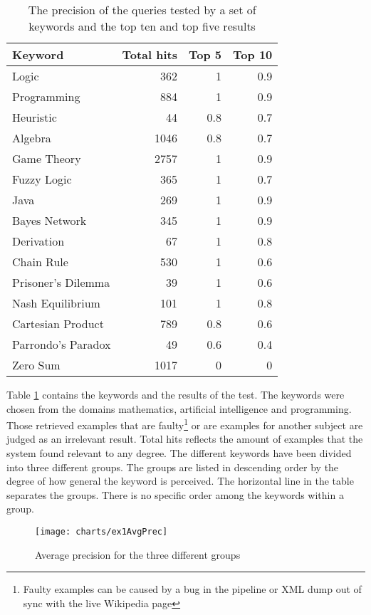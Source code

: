\begin{table}[h]
\centering
\small
\begin{tabular} {|| p{15em} | r | r | r ||} 
 \hline
 Keyword & Total hits & Top 5 & Top 10 \\ [0.5ex] 
 \hline

Logic & 362 & 1 & 0.9 \\
Programming & 884 & 1 & 0.9 \\
Heuristic & 44 & 0.8 & 0.7 \\
Algebra & 1046 & 0.8 & 0.7 \\
Game Theory & 2757 & 1 & 0.9 \\
\hline
Fuzzy Logic & 365 & 1 & 0.7 \\
Java & 269 & 1 & 0.9 \\
Bayes Network & 345 & 1 & 0.9 \\
Derivation & 67 & 1 & 0.8 \\
\hline
Chain Rule & 530 & 1 & 0.6 \\
Prisoner's Dilemma & 39 & 1 & 0.6 \\
Nash Equilibrium & 101 & 1 & 0.8 \\
Cartesian Product & 789 & 0.8 & 0.6 \\
Parrondo's Paradox & 49 & 0.6 & 0.4 \\
Zero Sum & 1017 & 0 & 0 \\

 \hline
\end{tabular}
\caption{The precision of the queries tested by a set of keywords and the top ten and top five results}
\label{table:precision_test}
\end{table}

Table \ref{table:precision_test} contains the keywords and the results of the test. The keywords were chosen from the domains mathematics, artificial intelligence and programming. Those retrieved examples that are faulty\footnote{Faulty examples can be caused by a bug in the pipeline or XML dump out of sync with the live Wikipedia page} or are examples for another subject are judged as an irrelevant result. Total hits reflects the amount of examples that the system found relevant to any degree. The different keywords have been divided into three different groups. The groups are listed in descending order by the degree of how general the keyword is perceived. The horizontal line in the table separates the groups. There is no specific order among the keywords within a group.

\begin{figure}[H] 
\caption{Average precision for the three different groups}
\texttt{[image: charts/ex1AvgPrec]}
\label{fig:ex1AvgPrec}
\end{figure}


